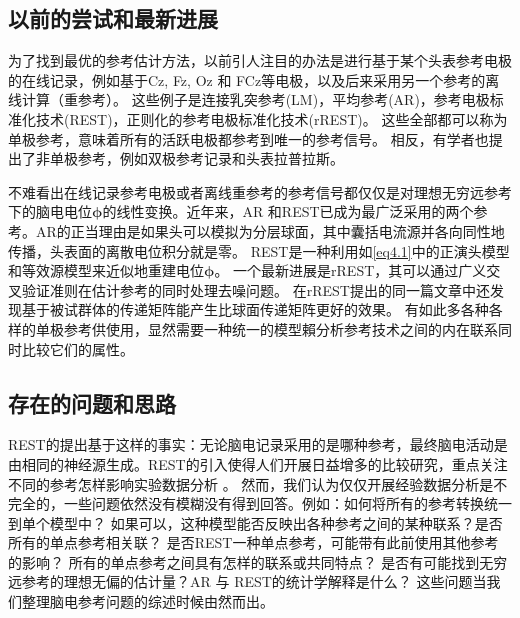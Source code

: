 \subsection{以前的尝试和最新进展}
为了找到最优的参考估计方法，以前引人注目的办法是进行基于某个头表参考电极的在线记录，例如基于Cz, Fz, Oz 和 FCz等电极，以及后来采用另一个参考的离线计算（重参考）。 这些例子是连接乳突参考(LM)，平均参考(AR)，参考电极标准化技术(REST)，正则化的参考电极标准化技术(rREST)。 这些全部都可以称为单极参考，意味着所有的活跃电极都参考到唯一的参考信号。 相反，有学者也提出了非单极参考，例如双极参考记录和头表拉普拉斯。

不难看出在线记录参考电极或者离线重参考的参考信号都仅仅是对理想无穷远参考下的脑电电位$\mathbf{\phi}$的线性变换。近年来，AR
和REST已成为最广泛采用的两个参考。AR的正当理由是如果头可以模拟为分层球面，其中囊括电流源并各向同性地传播，头表面的离散电位积分就是零。 REST是一种利用如\eqref{eq4.1}中的正演头模型和等效源模型来近似地重建电位$\mathbf{\phi}$。 一个最新进展是rREST，其可以通过广义交叉验证准则在估计参考的同时处理去噪问题。 在rREST提出的同一篇文章中还发现基于被试群体的传递矩阵能产生比球面传递矩阵更好的效果。 有如此多各种各样的单极参考供使用，显然需要一种统一的模型賴分析参考技术之间的内在联系同时比较它们的属性。

\subsection{存在的问题和思路}
REST的提出基于这样的事实：无论脑电记录采用的是哪种参考，最终脑电活动是由相同的神经源生成。REST的引入使得人们开展日益增多的比较研究，重点关注不同的参考怎样影响实验数据分析 。 然而，我们认为仅仅开展经验数据分析是不完全的，一些问题依然没有模糊没有得到回答。例如：如何将所有的参考转换统一到单个模型中？ 如果可以，这种模型能否反映出各种参考之间的某种联系？是否所有的单点参考相关联？ 是否REST一种单点参考，可能带有此前使用其他参考的影响？ 所有的单点参考之间具有怎样的联系或共同特点？ 是否有可能找到无穷远参考的理想无偏的估计量？AR 与 REST的统计学解释是什么？ 这些问题当我们整理脑电参考问题的综述时候由然而出。


